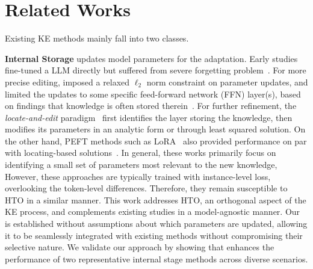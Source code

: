 \section{Related Works}
\label{sec:background}


Existing KE methods mainly fall into two classes. 

\textbf{Internal Storage} updates model parameters for the adaptation. 
Early studies fine-tuned a LLM directly but suffered from severe forgetting problem~\citep{wang2023knowledge}.
For more precise editing, \citet{zhu2020modifying} imposed a relaxed $\ell_2$ norm constraint on parameter updates, 
and \citet{dong2022calibrating,huang2023transformer} limited the updates to some specific feed-forward network (FFN) layer(s),
based on findings that knowledge is often stored therein~\citep{dai2021knowledge}. 
For further refinement, the \textit{locate-and-edit} paradigm~\citep{meng2022locating, meng2022mass} first identifies the layer storing the knowledge, then modifies its parameters in an analytic form or through least squared solution. 
On the other hand, PEFT methods such as LoRA~\citep{hu2021lora} also provided performance on par with locating-based solutions~\citep{wu2023eva,zhang2024comprehensive}. 
In general, these works primarily focus on identifying a small set of parameters most relevant to the new knowledge, 
However, these approaches are typically trained with instance-level loss, overlooking the token-level differences.
Therefore, they remain susceptible to HTO in a similar manner. 
This work addresses HTO, an orthogonal aspect of the KE process, and complements existing studies in a model-agnostic manner.
Our {\NAME} is established without assumptions about which parameters are updated,
allowing it to be seamlessly integrated with existing methods without compromising their selective nature.
We validate our approach by showing that {\NAME} enhances the performance of two representative internal stage methods across diverse scenarios.  




